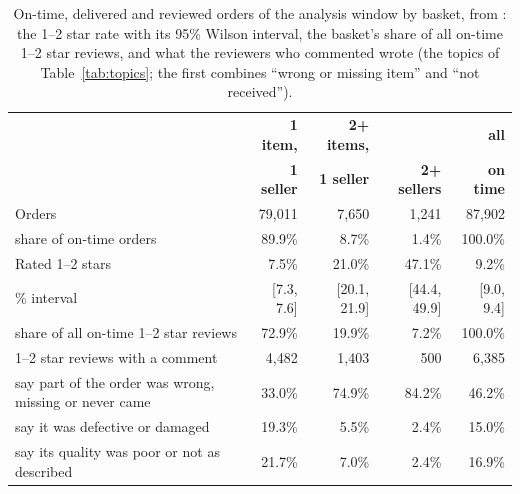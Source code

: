 \begin{table}[htbp]
\centering
\caption{On-time, delivered and reviewed orders of the analysis window by
basket, from : the 1--2 star rate with its 95\% Wilson
interval, the basket's share of all on-time 1--2 star reviews, and what the
reviewers who commented wrote (the topics of Table~\ref{tab:topics}; the first
combines ``wrong or missing item'' and ``not received'').}
\label{tab:basket}
\footnotesize
\setlength{\tabcolsep}{4pt}
\begin{tabular}{@{}p{6.6cm}rrrr@{}}
\toprule
 & \textbf{1 item,} & \textbf{2+ items,} & & \textbf{all} \\
 & \textbf{1 seller} & \textbf{1 seller} & \textbf{2+ sellers} & \textbf{on time} \\
\midrule
Orders & 79{,}011 & 7{,}650 & 1{,}241 & 87{,}902 \\
\quad share of on-time orders & 89.9\% & 8.7\% & 1.4\% & 100.0\% \\
Rated 1--2 stars & 7.5\% & 21.0\% & 47.1\% & 9.2\% \\
\quad 95\% interval & [7.3, 7.6] & [20.1, 21.9] & [44.4, 49.9] & [9.0, 9.4] \\
\quad share of all on-time 1--2 star reviews & 72.9\% & 19.9\% & 7.2\% & 100.0\% \\
1--2 star reviews with a comment & 4{,}482 & 1{,}403 & 500 & 6{,}385 \\
\quad say part of the order was wrong, missing or never came & 33.0\% & 74.9\% & 84.2\% & 46.2\% \\
\quad say it was defective or damaged & 19.3\% & 5.5\% & 2.4\% & 15.0\% \\
\quad say its quality was poor or not as described & 21.7\% & 7.0\% & 2.4\% & 16.9\% \\
\bottomrule
\end{tabular}
\end{table}

